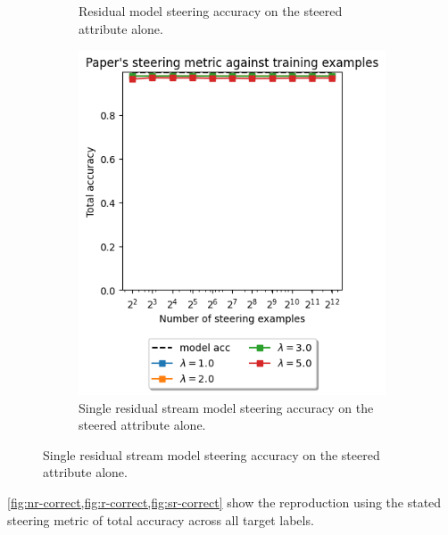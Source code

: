 \begin{figure}
\begin{subfigure}{0.45\textwidth}
        \caption{Residual model steering accuracy on the steered attribute alone.}
        \label{fig:r-correct}
    \end{subfigure}
    \begin{subfigure}{0.45\textwidth}
        \includegraphics[width=\textwidth]{figures/single-residual-full-reproduction.png}
        \caption{Single residual stream model steering accuracy on the steered attribute alone.}
        \label{fig:sr-correct}
    \end{subfigure}
\end{figure}

\cref{fig:nr-correct,fig:r-correct,fig:sr-correct} show the reproduction using the stated steering metric of total accuracy across all target labels.
